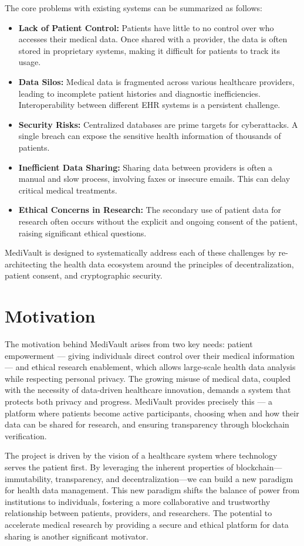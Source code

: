 The core problems with existing systems can be summarized as follows:
\begin{itemize}
    \item \textbf{Lack of Patient Control:} Patients have little to no control over who accesses their medical data. Once shared with a provider, the data is often stored in proprietary systems, making it difficult for patients to track its usage.
    \item \textbf{Data Silos:} Medical data is fragmented across various healthcare providers, leading to incomplete patient histories and diagnostic inefficiencies. Interoperability between different EHR systems is a persistent challenge.
    \item \textbf{Security Risks:} Centralized databases are prime targets for cyberattacks. A single breach can expose the sensitive health information of thousands of patients.
    \item \textbf{Inefficient Data Sharing:} Sharing data between providers is often a manual and slow process, involving faxes or insecure emails. This can delay critical medical treatments.
    \item \textbf{Ethical Concerns in Research:} The secondary use of patient data for research often occurs without the explicit and ongoing consent of the patient, raising significant ethical questions.
\end{itemize}

MediVault is designed to systematically address each of these challenges by re-architecting the health data ecosystem around the principles of decentralization, patient consent, and cryptographic security.

\section{Motivation}
The motivation behind MediVault arises from two key needs: patient empowerment — giving individuals direct control over their medical information — and ethical research enablement, which allows large-scale health data analysis while respecting personal privacy. The growing misuse of medical data, coupled with the necessity of data-driven healthcare innovation, demands a system that protects both privacy and progress. MediVault provides precisely this — a platform where patients become active participants, choosing when and how their data can be shared for research, and ensuring transparency through blockchain verification.

The project is driven by the vision of a healthcare system where technology serves the patient first. By leveraging the inherent properties of blockchain—immutability, transparency, and decentralization—we can build a new paradigm for health data management. This new paradigm shifts the balance of power from institutions to individuals, fostering a more collaborative and trustworthy relationship between patients, providers, and researchers. The potential to accelerate medical research by providing a secure and ethical platform for data sharing is another significant motivator.

